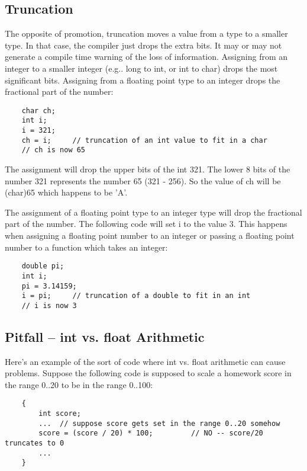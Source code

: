 \subsection{Truncation}

The opposite of promotion, truncation moves a value from a type to a smaller type. In that case, the compiler just drops the extra bits. It may or may not generate a compile time warning of the loss of information. Assigning from an integer to a smaller integer (e.g.. long to int, or int to char) drops the most significant bits. Assigning from a floating point type to an integer drops the fractional part of the number:

\begin{lstlisting}
    char ch;
    int i;
    i = 321;
    ch = i;     // truncation of an int value to fit in a char
    // ch is now 65
\end{lstlisting}

The assignment will drop the upper bits of the int 321. The lower 8 bits of the number 321 represents the number 65 (321 - 256). So the value of ch will be (char)65 which happens to be 'A'.

The assignment of a floating point type to an integer type will drop the fractional part of the number. The following code will set i to the value 3. This happens when assigning a floating point number to an integer or passing a floating point number to a function which takes an integer:

\begin{lstlisting}
    double pi;
    int i;
    pi = 3.14159;
    i = pi;     // truncation of a double to fit in an int
    // i is now 3
\end{lstlisting}

\subsection{Pitfall -- int vs. float Arithmetic}

Here's an example of the sort of code where int vs. float arithmetic can cause problems. Suppose the following code is supposed to scale a homework score in the range 0..20 to be in the range 0..100:

\begin{lstlisting}
    {
        int score;
        ...  // suppose score gets set in the range 0..20 somehow
        score = (score / 20) * 100;         // NO -- score/20 truncates to 0
        ...
    }
\end{lstlisting}


